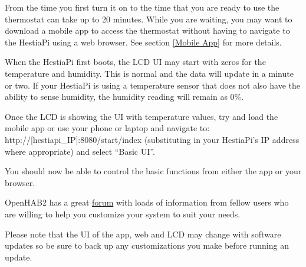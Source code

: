 From the time you first turn it on to the time that you are ready to use the
thermostat can take up to 20 minutes. While you are waiting, you may want to
download a mobile app to access the thermostat without having to navigate to
the HestiaPi using a web browser. See section \ref{Mobile App} for more
details.

When the HestiaPi first boots, the LCD UI may start with zeros for the
temperature and humidity. This is normal and the data will update in a minute
or two. If your HestiaPi is using a temperature sensor that does not also have
the ability to sense humidity, the humidity reading will remain as 0\%.

Once the LCD is showing the UI with temperature values, try and load the mobile
app or use your phone or laptop and navigate to:
http://[hestiapi\_IP]:8080/start/index (substituting in your HestiaPi's IP
address where appropriate) and select ``Basic UI''.

You should now be able to control the basic functions from either the app or
your browser.

OpenHAB2 has a great \href{https://community.openhab.org/}{forum} with loads of
information from fellow users who are willing to help you customize your system
to suit your needs.

Please note that the UI of the app, web and LCD may change with software updates
so be sure to back up any customizations you make before running an update.
